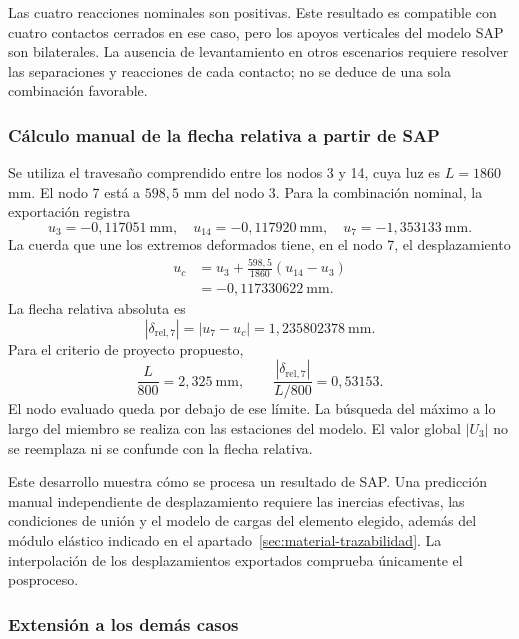 Las cuatro reacciones nominales son positivas. Este resultado es compatible con cuatro contactos cerrados en ese caso, pero los apoyos verticales del modelo SAP son bilaterales. La ausencia de levantamiento en otros escenarios requiere resolver las separaciones y reacciones de cada contacto; no se deduce de una sola combinación favorable.

\subsubsection{Cálculo manual de la flecha relativa a partir de SAP}

Se utiliza el travesaño comprendido entre los nodos 3 y 14, cuya luz es $L=1860$ mm. El nodo 7 está a $598{,}5$ mm del nodo 3. Para la combinación nominal, la exportación registra
\[
u_3=-0{,}117051\ \mathrm{mm},\quad
u_{14}=-0{,}117920\ \mathrm{mm},\quad
u_7=-1{,}353133\ \mathrm{mm}.
\]
La cuerda que une los extremos deformados tiene, en el nodo 7, el desplazamiento
\begin{align}
u_c&=u_3+\frac{598{,}5}{1860}(u_{14}-u_3)\\
&=-0{,}117330622\ \mathrm{mm}.
\end{align}
La flecha relativa absoluta es
\begin{equation}
\boxed{|\delta_{\mathrm{rel},7}|=|u_7-u_c|
=1{,}235802378\ \mathrm{mm}.}
\label{eq:manual_flecha}
\end{equation}
Para el criterio de proyecto propuesto,
\[
\frac{L}{800}=2{,}325\ \mathrm{mm},\qquad
\frac{|\delta_{\mathrm{rel},7}|}{L/800}=0{,}53153.
\]
El nodo evaluado queda por debajo de ese límite. La búsqueda del máximo a lo largo del miembro se realiza con las estaciones del modelo. El valor global $|U_3|$ no se reemplaza ni se confunde con la flecha relativa.

Este desarrollo muestra cómo se procesa un resultado de SAP. Una predicción manual independiente de desplazamiento requiere las inercias efectivas, las condiciones de unión y el modelo de cargas del elemento elegido, además del módulo elástico indicado en el apartado~\ref{sec:material-trazabilidad}. La interpolación de los desplazamientos exportados comprueba únicamente el posproceso.

\subsubsection{Extensión a los demás casos}

